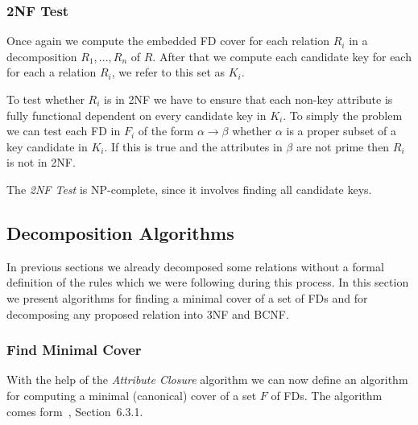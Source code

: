 \subsubsection{2NF Test}
Once again we compute the
embedded FD cover for each relation $R_i$ in a decomposition $R_1,...,R_n$ of $R$. After that 
we compute each candidate key for each for each a relation $R_i$, we refer to this set as $K_i$.
 
To test whether $R_i$ is in 2NF we have to ensure that each non-key attribute is fully
functional dependent on every candidate key in $K_i$. To simply the problem we can test
each FD in $F_i$ of the form $\alpha \rightarrow \beta$ whether $\alpha$ is a proper subset
of a key candidate in $K_i$. If this is true and the attributes in $\beta$ are not prime then
$R_i$ is not in 2NF.

The \textit{2NF Test} is NP-complete, since it involves finding all candidate keys.

\subsection{Decomposition Algorithms}
\label{sec:algdec}
In previous sections we already decomposed some relations without
a formal definition of the rules which we were following during this process. 
In this section we present algorithms for finding a minimal cover of a set of FDs and 
for decomposing any proposed relation into 3NF and BCNF.  

\subsubsection{Find Minimal Cover}
With the help of the \textit{Attribute Closure} algorithm we can now define an algorithm 
for computing a minimal (canonical) cover of a set $F$ of FDs. The algorithm comes form~\cite{bdb2}, Section~6.3.1.

